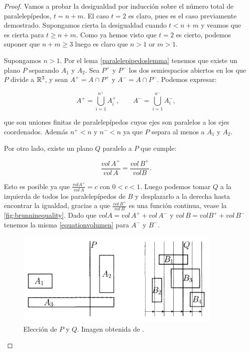 \begin{proof}
Vamos a probar la desigualdad por inducción sobre el número total de paralelepípedos, $t = n + m$.
El caso $t=2$ es claro, pues es el caso previamente demostrado.
Supongamos cierta la desigualdad cuando $t < n + m$ y veamos que es cierta para $t \geq n + m$. Como ya hemos visto que $t=2$ es cierto, podemos suponer que $n + m \geq 3$ luego es claro que $n > 1$ or $m > 1$.

Supongamos $n > 1$. Por el lema \ref{paralelepipedoslemma} tenemos que existe un plano $P$ separando $A_1$ y $A_2$. Sea $P^+$ y $P^-$ los dos semiespacios abiertos en los que $P$ divide a $\mathbb{R}^3$, y sean $A^+ = A \cap P^+$ y $A^- = A \cap P^-$. Podemos expresar:

\begin{equation*}
    A^+ = \displaystyle\bigcup_{i=1}^{n^+} A_i^+, \qquad A^- = \displaystyle\bigcup_{i=1}^{n^-} A_i^-,
\end{equation*}

que son uniones finitas de paralelepípedos cuyos ejes son paralelos a los ejes coordenados. Además $n^+ < n$ y $n^- < n$ ya que $P$ separa al menos a $A_1$ y $A_2$.

Por otro lado, existe un plano $Q$ paralelo a $P$ que cumple:

\begin{equation}\label{equationvolumen}
    \frac{vol \, A^+}{vol \, A} = \frac{vol \, B^+}{vol B}.
\end{equation}

Esto es posible ya que $\frac{vol A^+}{vol \, A} = c$ con $0 < c < 1$. Luego podemos tomar $Q$ a la izquierda de todos los paralelepípedos de $B$ y desplazarlo a la derecha hasta encontrar la igualdad, gracias a que $\frac{vol \, B^+}{vol \, B}$ es una función continua, vease la \autoref{fig:brunninequality}.
Dado que $vol A = vol \, A^+ + vol \, A^-$ y $vol \, B = vol B^+ + vol \, B^-$ tenemos la misma \autoref{equationvolumen} para $A^-$ y $B^-$.

\begin{figure}[h]
  \centering
  \includegraphics[width=0.9\textwidth]{gfx/brunninequality.png}
  \caption{\label{fig:brunninequality}Elección de $P$ y $Q$. Imagen obtenida de \cite{montielrosbook}.}
\end{figure}


\end{proof}
